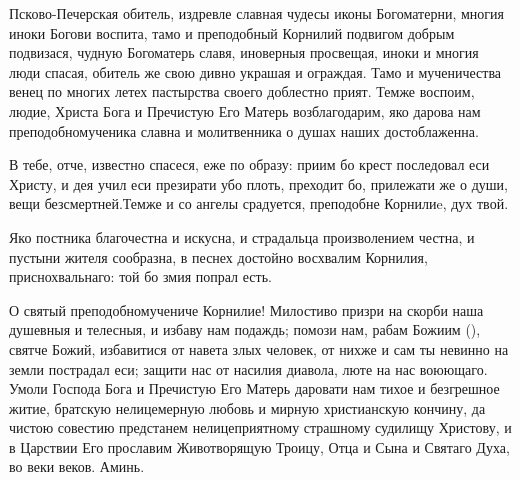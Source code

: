 \begin{mymulticols}



Псково-Печерская обитель, издревле славная чудесы иконы Богоматерни, многия иноки Богови воспита, тамо и преподобный Корнилий подвигом добрым подвизася, чудную Богоматерь славя, иноверныя просвещая, иноки и многия люди спасая, обитель же свою дивно украшая и ограждая. Тамо и мученичества венец по многих летех пастырства своего доблестно прият. Темже воспоим, людие, Христа Бога и Пречистую Его Матерь возблагодарим, яко дарова нам преподобномученика славна и молитвенника о душах наших достоблаженна.




В тебе, отче, известно спасеся, еже по образу: приим бо крест последовал еси Христу, и дея учил еси презирати убо плоть, преходит бо, прилежати же о души, вещи безсмертней.Темже и со ангелы срадуется, преподобне Корнилиe, дух твой.




Яко постника благочестна и искусна, и страдальца произволением честна, и пустыни жителя сообразна, в песнех достойно восхвалим Корнилия, приснохвальнаго: той бо змия попрал есть.




О святый преподобномучениче Корнилие!  Милостиво призри на скорби наша душевныя и телесныя, и избаву нам подаждь; помози нам, рабам Божиим (), святче Божий, избавитися от навета злых человек, от нихже и сам ты невинно на земли пострадал еси; защити нас от насилия диавола, люте на нас воюющаго. Умоли Господа Бога и Пречистую Его Матерь даровати нам тихое и безгрешное житие, братскую нелицемерную любовь и мирную христианскую кончину, да чистою совестию предстанем нелицеприятному страшному судилищу Христову, и в Царствии Его прославим Животворящую Троицу, Отца и Сына и Святаго Духа, во веки веков. Аминь.


\end{mymulticols}

